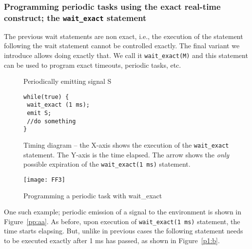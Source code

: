 \subsubsection{Programming periodic tasks using the exact real-time
  construct; the \texttt{wait\_exact} statement}
\label{sec:progr-using-exact}

The previous wait statements are non exact, i.e., the 
execution of the statement following the wait statement cannot be
controlled exactly. The final variant we introduce allows doing exactly
that. We call it \texttt{wait\_exact(M)} and this statement can be used to
program exact timeouts, periodic tasks, etc.

\begin{figure}[t!]
  \centering
	\vspace{-10pt}
        \begin{SubFloat}{\label{pp:aa}Periodically emitting signal S}
					\begin{minipage}{0.4\textwidth}
        \begin{lstlisting}[style=sysj,morekeywords={emit,trap,pause,exit,wait_exact}]
while(true) { 
 wait_exact (1 ms); 
 emit S; 
 //do something 
}
\end{lstlisting}
\end{minipage}
\end{SubFloat}

\begin{SubFloat}{\label{p1:b}Timing diagram -- the X-axis shows the
    execution of the \texttt{wait\_exact} statement. The Y-axis is the
    time elapsed. The arrow shows the \textit{only} possible expiration
    of the \texttt{wait\_exact(1 ms)} statement.}
		\begin{minipage}{0.45\textwidth}
			\centering
  \texttt{[image: FF3]}
\end{minipage}
\end{SubFloat}
  \caption{Programming a periodic task with wait\_exact}
  \label{fig:p1}
  \vspace{-10pt}
\end{figure}

One such example; periodic emission of a signal to the environment is
shown in Figure~\ref{pp:aa}. As before, upon execution of
\texttt{wait\_exact(1 ms)} statement, the time starts elapsing. But,
unlike in previous cases the following statement needs to be executed
exactly after 1 ms has passed, as shown in Figure~\ref{p1:b}.



